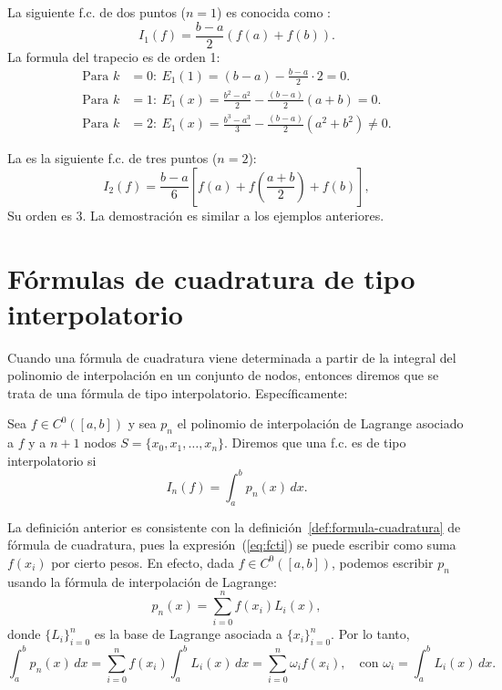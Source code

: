 \begin{example}
  \label{ex:formula-trapecio}
  La siguiente f.c. de dos puntos ($n=1$) es conocida
  como :
  \begin{equation*}
    I_1(f)= \frac{b-a}{2}\left(f(a)+f(b)\right).
  \end{equation*}
  La formula del trapecio es de orden 1:
  \begin{align*}
   \text{Para } k&=0:\ E_1(1) =  (b-a) - \frac{b-a}2\cdot 2 = 0.
   \\
   \text{Para } k&=1:\ E_1(x) = \frac{b^2-a^2}{2} -
   \frac{(b-a)}{2}(a+b) = 0.
   \\
   \text{Para } k&=2:\ E_1(x) = \frac{b^3-a^3}{3} - \frac{(b-a)}{2}(a^2+b^2) 
   \neq 0.
  \end{align*}
\end{example}

\begin{example}
  \label{ex:formula-simpson}
  La  es la siguiente f.c.
  de tres puntos ($n=2$):
  \begin{equation*}
    I_2(f)= \frac{b-a}{6}\left[f(a)+f
      \left(\frac{a+b}{2}\right)+f(b)\right],
  \end{equation*}
  Su orden es $3$. La demostración es similar a los ejemplos anteriores.
\end{example}

\section{Fórmulas de cuadratura de tipo interpolatorio}
\label{sec:cuadratura-interpolatorio}

Cuando una fórmula de cuadratura viene determinada a partir de la integral del
polinomio de interpolación en un conjunto de nodos, entonces diremos
que se trata de una fórmula de tipo interpolatorio. Específicamente:
\begin{definition}
  Sea $f\in C^0([a,b])$ y sea $p_n$ el polinomio de interpolación de
  Lagrange asociado a $f$ y a $n+1$ nodos
  $S=\{x_0,x_1,\dots,x_n\}$. Diremos que una f.c. es de tipo
  interpolatorio si 
  \begin{equation}
    \label{eq:fcti}
    I_n(f)=\int_a^b p_n(x)\, dx.
  \end{equation}
\end{definition}

La definición anterior es consistente con la
definición~\ref{def:formula-cuadratura} de fórmula de cuadratura, pues
la expresión~(\ref{eq:fcti}) se puede escribir como suma $f(x_i)$ por
cierto pesos. En efecto, dada $f\in C^0([a,b])$, podemos escribir
$p_n$ usando la fórmula de interpolación de Lagrange:
\begin{equation*}
  p_n(x)=\sum_{i=0}^n f(x_i) L_i(x),
\end{equation*}
donde $\{L_i\}_{i=0}^n$ es la base de Lagrange asociada a
$\{x_i\}_{i=0}^n$. Por lo tanto,
\begin{equation*}
  \int_a^bp_n(x)\,dx = \sum_{i=0}^n f(x_i) \int_a^b L_i(x)\,dx 
  =\sum_{i=0}^n \omega_i f(x_i), \quad \text{con } \omega_i=\int_a^b L_i(x)\,dx.
\end{equation*}

